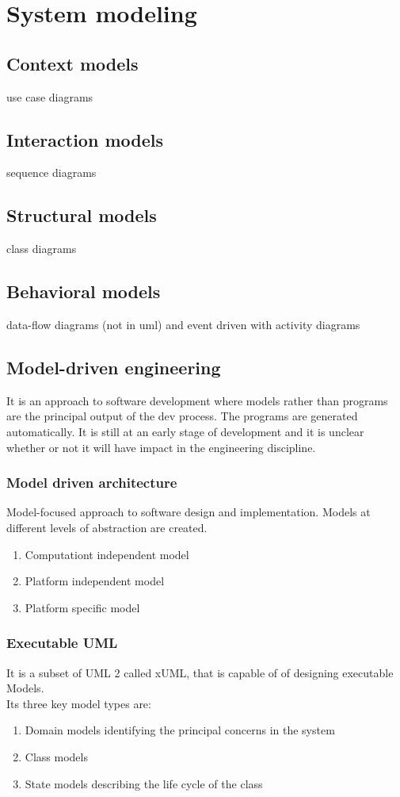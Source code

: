 \documentclass[a4paper,11pt,twocolumn]{report}
\begin{document}
    \chapter{System modeling}
    \section{Context models}
    use case diagrams
    \section{Interaction models}
    sequence diagrams
    \section{Structural models}
    class diagrams
    \section{Behavioral models}
    data-flow diagrams (not in uml) and event driven with activity diagrams
    \section{Model-driven engineering}
    It is an approach to software development where models rather than programs
    are the principal output of the dev process. The programs are generated
    automatically. It is still at an early stage of development and it is
    unclear whether or not it will have impact in the engineering discipline.
    \subsection{Model driven architecture} 
    Model-focused approach to software design and implementation. Models at 
    different levels of abstraction are created.
    \begin{enumerate}
        \item Computationt independent model
        \item Platform independent model
        \item Platform specific model
    \end{enumerate}
    \subsection{Executable UML}
    It is a subset of UML 2 called xUML, that is capable of of designing
    executable Models.\\
    Its three key model types are:
    \begin{enumerate}
        \item Domain models identifying the principal concerns in the system
        \item Class models
        \item State models describing the life cycle of the class
    \end{enumerate}
\end{document}
